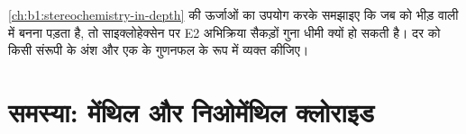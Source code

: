 \begin{exercise}[$\star\star\star$]\label{exo:b1:elimination:12}
\cref{ch:b1:stereochemistry-in-depth} की ऊर्जाओं का उपयोग करके समझाइए कि
जब  को भीड़ वाली  में  बनना पड़ता है, तो साइक्लोहेक्सेन पर
E2 अभिक्रिया सैकड़ों गुना धीमी क्यों हो सकती है। दर को
किसी संरूपी के अंश और एक  के गुणनफल के रूप में व्यक्त कीजिए।
\end{exercise}

\section{समस्या: मेंथिल और निओमेंथिल क्लोराइड}

